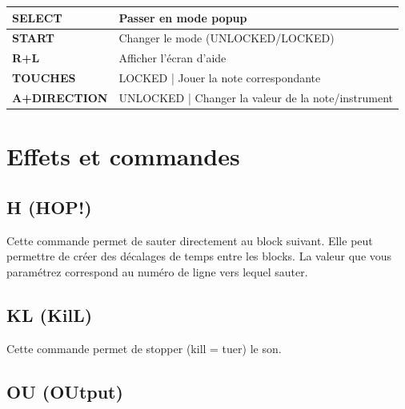 \documentclass[12pt,a4paper]{article}
\begin{document}
        \tablelasttail{\hline}
        \begin{supertabular}{|l|p{11cm}|}
        \hline
            {\bf SELECT} & Passer en mode popup \\
            \hline
            {\bf START} & Changer le mode (UNLOCKED/LOCKED) \\
            \hline
            {\bf R+L} & Afficher l'écran d'aide \\
            \hline
            {\bf TOUCHES} & LOCKED | Jouer la note correspondante \\
            \hline
            {\bf A+DIRECTION} & UNLOCKED | Changer la valeur de la note/instrument \\ 
        \hline
        \end{supertabular}
    
  \section{Effets et commandes}
  

  \subsection{H (HOP!)}

    Cette commande permet de sauter directement au block suivant. Elle peut permettre de créer des décalages de temps entre les blocks. La valeur que vous paramétrez correspond au numéro de ligne vers lequel sauter.

  \subsection{KL (KilL)}
  
  Cette commande permet de stopper (kill = tuer) le son. 

  \subsection{OU (OUtput)}
\end{document}
